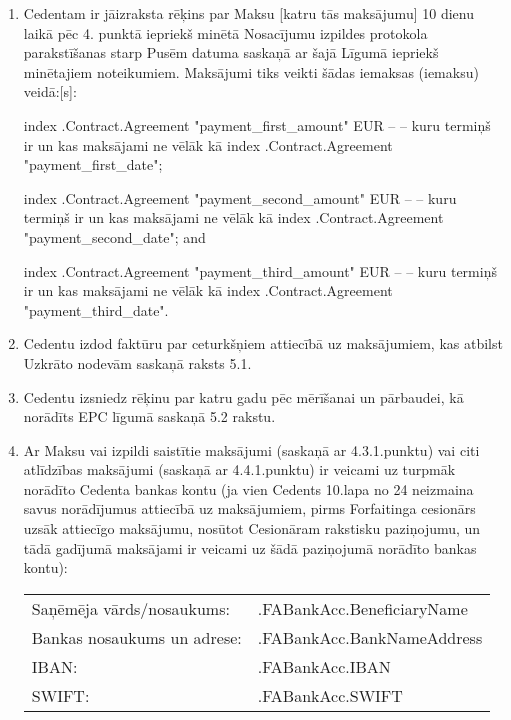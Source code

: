 \documentclass[a4paper]{article}
\begin{document}
\begin{enumerate}
\item{Cedentam ir jāizraksta rēķins par Maksu [katru tās maksājumu] 10 dienu laikā pēc 4. punktā
iepriekš minētā Nosacījumu izpildes protokola parakstīšanas starp Pusēm datuma saskaņā ar šajā
Līgumā iepriekš minētajiem noteikumiem. Maksājumi tiks veikti šādas iemaksas (iemaksu) veidā:{[}s{]}: \par

    {{index .Contract.Agreement "payment_first_amount"}} EUR – – kuru termiņš ir un kas maksājami ne vēlāk kā {{index .Contract.Agreement "payment_first_date"}}; \par
    {{index .Contract.Agreement "payment_second_amount"}} EUR – – kuru termiņš ir un kas maksājami ne vēlāk kā {{index .Contract.Agreement "payment_second_date"}}; and \par
    {{index .Contract.Agreement "payment_third_amount"}} EUR – – kuru termiņš ir un kas maksājami ne vēlāk kā {{index .Contract.Agreement "payment_third_date"}}.\par}

\item{Cedentu izdod faktūru par ceturkšņiem attiecībā uz maksājumiem, kas atbilst Uzkrāto nodevām
saskaņā raksts 5.1.}

\item{Cedentu izsniedz rēķinu par katru gadu pēc mērīšanai un pārbaudei, kā norādīts EPC līgumā
saskaņā 5.2 rakstu.}

\item{Ar Maksu vai izpildi saistītie maksājumi (saskaņā ar 4.3.1.punktu) vai citi atlīdzības maksājumi
(saskaņā ar 4.4.1.punktu) ir veicami uz turpmāk norādīto Cedenta bankas kontu (ja vien Cedents
10.lapa no 24
neizmaina savus norādījumus attiecībā uz maksājumiem, pirms Forfaitinga cesionārs uzsāk
attiecīgo maksājumu, nosūtot Cesionāram rakstisku paziņojumu, un tādā gadījumā maksājami ir
veicami uz šādā paziņojumā norādīto bankas kontu): \par

    \begin{tabu}{XX[2]}
      Saņēmēja vārds/nosaukums: 	& 	{{.FABankAcc.BeneficiaryName}} 	\\
      Bankas nosaukums un adrese: 	& 	{{.FABankAcc.BankNameAddress}} 	\\
      IBAN:			& 	{{.FABankAcc.IBAN}} 		\\
      SWIFT:			& 	{{.FABankAcc.SWIFT}} 		\\
    \end{tabu}}


\end{enumerate}
\end{document}
